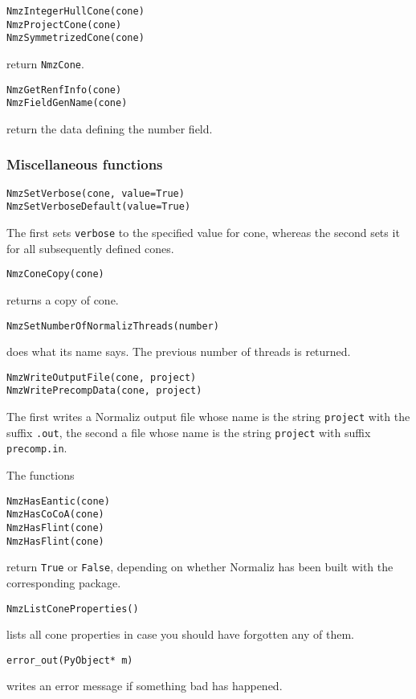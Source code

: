 \begin{small}
\begin{Verbatim}
NmzIntegerHullCone(cone)
NmzProjectCone(cone)
NmzSymmetrizedCone(cone)
\end{Verbatim}
return \verb|NmzCone|.

\begin{Verbatim}
NmzGetRenfInfo(cone)
NmzFieldGenName(cone)
\end{Verbatim}
return the data defining the number field.

\subsubsection{Miscellaneous functions}

\begin{Verbatim}
NmzSetVerbose(cone, value=True)
NmzSetVerboseDefault(value=True)
\end{Verbatim}
The first sets \verb|verbose| to the specified value for cone, whereas the second sets it for all subsequently defined cones.

\begin{Verbatim}
NmzConeCopy(cone)
\end{Verbatim}
returns a copy of cone.

\begin{Verbatim}
NmzSetNumberOfNormalizThreads(number)
\end{Verbatim}
does what its name says. The previous number of threads is returned.

\begin{Verbatim}
NmzWriteOutputFile(cone, project)
NmzWritePrecompData(cone, project)
\end{Verbatim}
The first writes a Normaliz output file whose name is the string \verb|project| with the suffix \verb|.out|, the second a file whose name is the string \verb|project| with suffix \verb|precomp.in|.


The functions
\begin{Verbatim}
NmzHasEantic(cone)
NmzHasCoCoA(cone)
NmzHasFlint(cone)
NmzHasFlint(cone)
\end{Verbatim}
return \verb|True| or \verb|False|, depending on whether Normaliz has been built with the corresponding package.

\begin{Verbatim}
NmzListConeProperties() 
\end{Verbatim}
lists all cone properties in case you should have forgotten any of them.

\begin{Verbatim}
error_out(PyObject* m)
\end{Verbatim}
writes an error message if something bad has happened.


\end{small}
